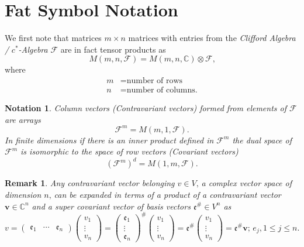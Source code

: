 \documentclass[aps, preprint]{revtex4}
\newtheorem{notation}[theorem]{Notation}
\newtheorem{remark}[theorem]{Remark}
\begin{document}
\section{Fat Symbol Notation}
We first note that matrices $m \times n$ matrices with entries from the \emph{Clifford Algebra / }$c^{ \ast }$\emph{-Algebra }$\mathcal{F}$ are in fact tensor products as \emph{\ }
\begin{equation}M \left (m ,n ,\mathcal{F}\right ) =M \left (m ,n ,\mathbb{C}\right ) \otimes \mathcal{F}\text{,}
\end{equation}where
\begin{align}m &  =\text{number of rows} \\
n &  =\text{number of columns.}\end{align}


\begin{notation}
Column vectors (Contravariant vectors) formed from elements of $\mathcal{F}$ are arrays
\begin{equation}\mathcal{F}^{m} =M \left (m ,1 ,\mathcal{F}\right )\text{.}
\end{equation}In finite dimensions if there is an inner product defined in $\mathcal{F}^{m}$ the dual space of $\mathcal{F}^{m}$ is isomorphic to the space of row vectors (Covariant vectors)
\begin{equation}\left (\mathcal{F}^{m}\right )^{d} =M \left (1 ,m ,\mathcal{F}\right )\text{.}
\end{equation}
\end{notation}


\begin{remark}
Any contravariant vector belonging $v \in V\text{,}$ a complex vector space of dimension $n\text{,}$ can be expanded in terms of a product of a contravariant vector $\mathbf{v} \in \mathbb{C}^{n}$ and a super covariant vector of basis vectors $\mathfrak{e}^{\#} \in V^{n}$ as
\begin{equation}v =\left (\begin{array}{ccc}\mathfrak{e}_{1} & \cdots  & \mathfrak{e}_{n}\end{array}\right ) \left (\begin{array}{c}v_{1} \\
\vdots  \\
v_{n}\end{array}\right ) =\left (\begin{array}{c}\mathfrak{e}_{1} \\
\vdots  \\
\mathfrak{e}_{n}\end{array}\right )^{\#} \left (\begin{array}{c}v_{1} \\
\vdots  \\
v_{n}\end{array}\right ) =\mathfrak{e}^{\#} \left (\begin{array}{c}v_{1} \\
\vdots  \\
v_{n}\end{array}\right ) =\mathfrak{e}^{\#} \mathbf{v} ;\,e_{j} ,1 \leq j \leq n\text{.}
\end{equation}
\end{remark}
\end{document}

